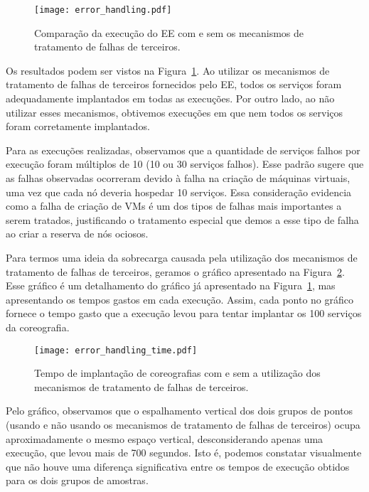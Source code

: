 \begin{figure}[h]
  \centering
  \texttt{[image: error\_handling.pdf]}
  \caption{Comparação da execução do EE com e sem os mecanismos de tratamento de falhas de terceiros.}
  \label{fig:error_handling}
\end{figure}

Os resultados podem ser vistos na Figura~\ref{fig:error_handling}.
Ao utilizar os mecanismos de tratamento de falhas de terceiros fornecidos pelo EE,
todos os serviços foram adequadamente implantados em todas as execuções.
Por outro lado, ao não utilizar esses mecanismos, obtivemos execuções em que nem todos
os serviços foram corretamente implantados.

Para as execuções realizadas, observamos que
a quantidade de serviços falhos por execução foram múltiplos de 10
(10 ou 30 serviços falhos).
Esse padrão sugere que as falhas observadas
ocorreram devido à falha na criação de máquinas virtuais,
uma vez que cada nó deveria hospedar 10 serviços.
Essa consideração evidencia como a falha de criação de VMs é um
dos tipos de falhas mais importantes a serem tratados,
justificando o tratamento especial que demos a esse tipo de falha
ao criar a reserva de nós ociosos.

Para termos uma ideia da sobrecarga causada pela utilização dos mecanismos de 
tratamento de falhas de terceiros, geramos o gráfico apresentado 
na Figura~\ref{fig:error_handling_time}.
Esse gráfico é um detalhamento do gráfico já apresentado na Figura~\ref{fig:error_handling},
mas apresentando os tempos gastos em cada execução.
Assim, cada ponto no gráfico fornece o tempo gasto que a execução levou
para tentar implantar os 100 serviços da coreografia.

\begin{figure}[h]
  \centering
  \texttt{[image: error\_handling\_time.pdf]}
  \caption{Tempo de implantação de coreografias com e sem a utilização dos mecanismos de tratamento de falhas de terceiros.}
  \label{fig:error_handling_time}
\end{figure}

Pelo gráfico, observamos que o espalhamento vertical dos dois grupos de pontos
(usando e não usando os mecanismos de tratamento de falhas de terceiros) 
ocupa aproximadamente o mesmo espaço vertical, desconsiderando apenas uma execução, 
que levou mais de 700 segundos.
Isto é, podemos constatar visualmente que não houve uma diferença significativa
entre os tempos de execução obtidos para os dois grupos de amostras.





